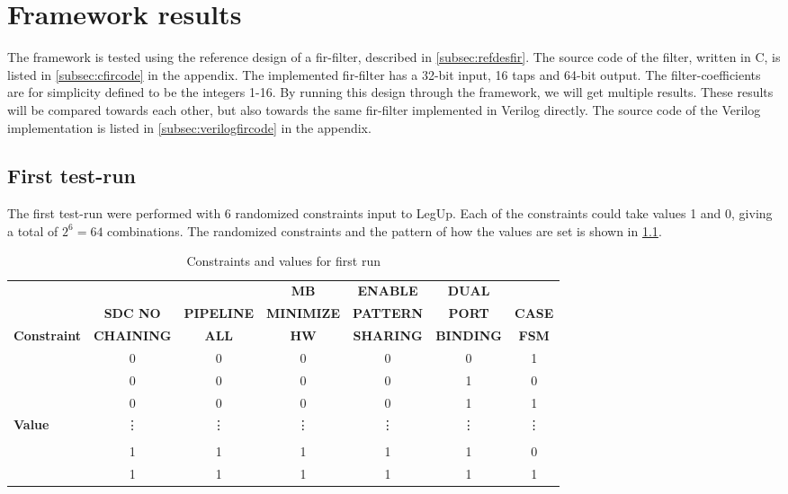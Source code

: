 \chapter{\label{chp:frameworkresults}Framework results}
The framework is tested using the reference design of a \gls{fir}-filter, described in \cref{subsec:refdesfir}. The source code of the filter, written in C, is listed in \cref{subsec:cfircode} in the appendix. The implemented \gls{fir}-filter has a 32-bit input, 16 taps and 64-bit output. The filter-coefficients are for simplicity defined to be the integers 1-16. By running this design through the framework, we will get multiple results. These results will be compared towards each other, but also towards the same \gls{fir}-filter implemented in Verilog directly. The source code of the Verilog implementation is listed in \cref{subsec:verilogfircode} in the appendix.

\section{\label{sec:firstrun}First test-run}
The first test-run were performed with 6 randomized constraints input to LegUp. Each of the constraints could take values 1 and 0, giving a total of $2^6=64$ combinations. The randomized constraints and the pattern of how the values are set is shown in \cref{tab:randomconstraint}.

\begin{table}
\tiny
    \begin{center}
    \begin{tabular}{l|cccccc}
     & & & \textbf{MB} & \textbf{ENABLE} & \textbf{DUAL} & \\
          &
          \textbf{SDC NO} & 
          \textbf{PIPELINE} & 
          \textbf{MINIMIZE} & 
          \textbf{PATTERN} & 
          \textbf{PORT} &
          \textbf{CASE} \\
        \textbf{Constraint}
           & \textbf{CHAINING}
           & \textbf{ALL}
           & \textbf{HW}
           & \textbf{SHARING}
           & \textbf{BINDING}
           & \textbf{FSM}
    \\ \midrule
    & 0 & 0 & 0 & 0 & 0 & 1 \\
    & 0 & 0 & 0 & 0 & 1 & 0 \\
    & 0 & 0 & 0 & 0 & 1 & 1 \\
    \textbf{Value} & \vdots & \vdots & \vdots & \vdots & \vdots & \vdots \\
    & &  &  &  &  &  \\
    & 1 & 1 & 1 & 1 & 1 & 0 \\
    & 1 & 1 & 1 & 1 & 1 & 1
    \\ \bottomrule
    \end{tabular}
    \caption{\label{tab:randomconstraint}Constraints and values for first run}
    \end{center}
\end{table}

